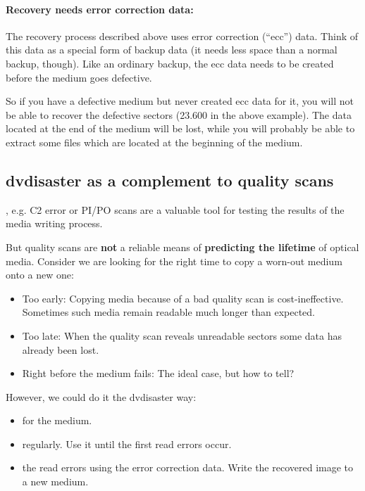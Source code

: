 \paragraph{Recovery needs error correction data:}
The recovery process described above uses error correction (``ecc'') data.
Think of this data as a special form of backup data (it needs less space
than a normal backup, though). Like an ordinary backup, the ecc data needs
to be created before the medium goes defective.

So if you have a defective medium but never created ecc data for it, you will
not be able to recover the defective sectors (23.600 in the above example).
The data located at the end of the medium will be lost, while you will probably
be able to extract some files which are located at the beginning of the medium.
\newpage

\subsection{dvdisaster as a complement to quality scans}

, e.g. C2 error or PI/PO scans are a valuable tool
for testing the results of the media writing process.

\smallskip

But quality scans are {\bf not} a reliable means of
{\bf predicting the lifetime} of optical media.
Consider we are looking for the right time to copy a worn-out medium onto a new one:

\begin{itemize}
\item Too early: Copying media because of a bad quality scan is cost-ineffective.
  Sometimes such media remain readable much longer than expected.
\item Too late: When the quality scan reveals unreadable sectors some data has already been lost.
\item Right before the medium fails: The ideal case, but how to tell?
\end{itemize}

However, we could do it the dvdisaster way:

\begin{itemize}
\item {} for the medium.
\item {} regularly. Use it until the first read errors occur.
\item {} the read errors using the error correction data.
  Write the recovered image to a new medium.
\end{itemize}

